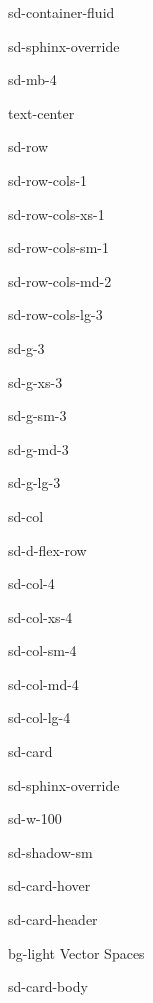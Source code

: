 \documentclass[letterpaper,10pt,english]{jupyterBook}
\let\sphinxpxdimen\pdfpxdimen\else\newdimen\sphinxpxdimen
\begin{document}
\begin{sphinxuseclass}{sd-container-fluid}
\begin{sphinxuseclass}{sd-sphinx-override}
\begin{sphinxuseclass}{sd-mb-4}
\begin{sphinxuseclass}{text-center}
\begin{sphinxuseclass}{sd-row}
\begin{sphinxuseclass}{sd-row-cols-1}
\begin{sphinxuseclass}{sd-row-cols-xs-1}
\begin{sphinxuseclass}{sd-row-cols-sm-1}
\begin{sphinxuseclass}{sd-row-cols-md-2}
\begin{sphinxuseclass}{sd-row-cols-lg-3}
\begin{sphinxuseclass}{sd-g-3}
\begin{sphinxuseclass}{sd-g-xs-3}
\begin{sphinxuseclass}{sd-g-sm-3}
\begin{sphinxuseclass}{sd-g-md-3}
\begin{sphinxuseclass}{sd-g-lg-3}
\begin{sphinxuseclass}{sd-col}
\begin{sphinxuseclass}{sd-d-flex-row}
\begin{sphinxuseclass}{sd-col-4}
\begin{sphinxuseclass}{sd-col-xs-4}
\begin{sphinxuseclass}{sd-col-sm-4}
\begin{sphinxuseclass}{sd-col-md-4}
\begin{sphinxuseclass}{sd-col-lg-4}
\begin{sphinxuseclass}{sd-card}
\begin{sphinxuseclass}{sd-sphinx-override}
\begin{sphinxuseclass}{sd-w-100}
\begin{sphinxuseclass}{sd-shadow-sm}
\begin{sphinxuseclass}{sd-card-hover}
\begin{sphinxuseclass}{sd-card-header}
\begin{sphinxuseclass}{bg-light}
\sphinxAtStartPar
Vector Spaces

\end{sphinxuseclass}
\end{sphinxuseclass}
\begin{sphinxuseclass}{sd-card-body}
\begin{figure}[htbp]
\centering

\noindent\sphinxincludegraphics[width=250\sphinxpxdimen]{{5_subspaces}.svg}
\end{figure}


\end{sphinxuseclass}
\end{sphinxuseclass}
\end{sphinxuseclass}
\end{sphinxuseclass}
\end{sphinxuseclass}
\end{sphinxuseclass}
\end{sphinxuseclass}
\end{sphinxuseclass}
\end{sphinxuseclass}
\end{sphinxuseclass}
\end{sphinxuseclass}
\end{sphinxuseclass}
\end{sphinxuseclass}
\end{sphinxuseclass}
\end{sphinxuseclass}
\end{sphinxuseclass}
\end{sphinxuseclass}
\end{sphinxuseclass}
\end{sphinxuseclass}
\end{sphinxuseclass}
\end{sphinxuseclass}
\end{sphinxuseclass}
\end{sphinxuseclass}
\end{sphinxuseclass}
\end{sphinxuseclass}
\end{sphinxuseclass}
\end{sphinxuseclass}
\end{sphinxuseclass}
\end{document}
